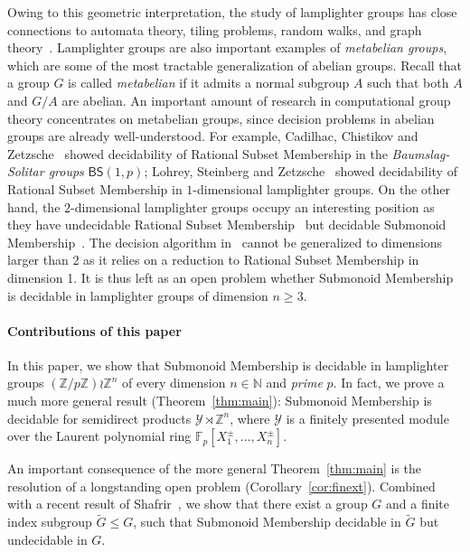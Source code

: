 \documentclass[a4paper,UKenglish,cleveref, autoref, thm-restate]{lipics-v2021}
\newcommand{\Z}{\mathbb{Z}}
\newcommand{\N}{\mathbb{N}}
\newcommand{\F}{\mathbb{F}}
\newcommand{\mY}{\mathcal{Y}}
\theoremstyle{definition}
\theoremstyle{definition}
\theoremstyle{definition}
\begin{document}
Owing to this geometric interpretation, the study of lamplighter groups has close connections to automata theory, tiling problems, random walks, and graph theory~\cite{barbieri2016group, bartholdi2022simulations, kambites2006spectra, lohrey2011tilings, lyons1996random}.
Lamplighter groups are also important examples of \emph{metabelian groups}, which are some of the most tractable generalization of abelian groups.
Recall that a group $G$ is called \emph{metabelian} if it admits a normal subgroup $A$ such that both $A$ and $G/A$ are abelian.
An important amount of research in computational group theory concentrates on metabelian groups, since decision problems in abelian groups are already well-understood.
For example, Cadilhac, Chistikov and Zetzsche~\cite{DBLP:conf/icalp/CadilhacCZ20} showed decidability of Rational Subset Membership in the \emph{Baumslag-Solitar groups} $\mathsf{BS}(1, p)$; Lohrey, Steinberg and Zetzsche~\cite{lohrey2011tilings} showed decidability of Rational Subset Membership in $1$-dimensional lamplighter groups.
On the other hand, the $2$-dimensional lamplighter groups occupy an interesting position as they have undecidable Rational Subset Membership~\cite{lohrey2011tilings} but decidable Submonoid Membership~\cite{potthast2020submonoid}.
The decision algorithm in~\cite{potthast2020submonoid} cannot be generalized to dimensions larger than 2 as it relies on a reduction to Rational Subset Membership in dimension 1.
It is thus left as an open problem whether Submonoid Membership is decidable in lamplighter groups of dimension $n \geq 3$.

\paragraph*{Contributions of this paper}

In this paper, we show that Submonoid Membership is decidable in lamplighter groups $(\Z/p\Z) \wr \Z^n$ of every dimension $n \in \N$ and \emph{prime} $p$.
In fact, we prove a much more general result (Theorem~\ref{thm:main}): Submonoid Membership is decidable for semidirect products $\mY \rtimes \Z^n$, where $\mY$ is a finitely presented module over the Laurent polynomial ring $\F_p[X_1^{\pm}, \ldots, X_n^{\pm}]$.


An important consequence of the more general Theorem~\ref{thm:main} is the resolution of a longstanding open problem (Corollary~\ref{cor:finext}).
Combined with a recent result of Shafrir~\cite{shafrir2024decidability}, we show that there exist a group $G$ and a finite index subgroup $\widetilde{G} \leq G$, such that Submonoid Membership decidable in $\widetilde{G}$ but undecidable in $G$.
\end{document}
